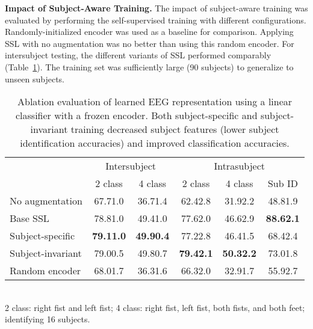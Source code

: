 \documentclass{article}
\newcommand{\std}[1]{{\scriptsize{#1}}}
\renewcommand{\paragraph}[1]{\textbf{#1}\hspace{1em}}
\begin{document}
\paragraph{Impact of Subject-Aware Training.}
The impact of subject-aware training was evaluated by performing the
self-supervised training with different configurations. Randomly-initialized
encoder was used as a baseline for comparison. Applying SSL with no augmentation
was no better than using this random encoder. For intersubject testing, the
different variants of SSL performed comparably (Table~\ref{table:eeg:losses}).
The training set was sufficiently large (90 subjects) to generalize to unseen
subjects.



\begin{table}
  \caption{Ablation evaluation of learned EEG representation using a linear
  classifier with a frozen encoder. Both subject-specific and subject-invariant
  training decreased subject features (lower subject identification accuracies)
  and improved classification accuracies.}
  \label{table:eeg:losses}
  \centering
  \small
  \begin{tabular}{lccccc}
    \toprule
    & \multicolumn{2}{c}{Intersubject} & \multicolumn{3}{c}{Intrasubject} \\
    \cmidrule(lr){2-3}\cmidrule(lr){4-6}
    & 2 class & 4 class & 2 class & 4 class & Sub ID\\
    \hline
No augmentation
& 67.7\std{1.0} & 36.7\std{1.4}
& 62.4\std{2.8} & 31.9\std{2.2}
& 48.8\std{1.9} \\

Base SSL
& 78.8\std{1.0} & 49.4\std{1.0}
& 77.6\std{2.0} & 46.6\std{2.9}
& \textbf{88.6\std{2.1}} \\



Subject-specific
& \textbf{79.1\std{1.0}} & \textbf{49.9\std{0.4}}
& 77.2\std{2.8} & 46.4\std{1.5}
& 68.4\std{2.4} \\

Subject-invariant
& 79.0\std{0.5} & 49.8\std{0.7}
& \textbf{79.4\std{2.1}} & \textbf{50.3\std{2.2}}
& 73.0\std{1.8} \\



    \hline
    Random encoder
& 68.0\std{1.7} & 36.3\std{1.6}
& 66.3\std{2.0} & 32.9\std{1.7}
& 55.9\std{2.7} \\
    \bottomrule
  \end{tabular}\\
  \footnotesize{2 class: right fist and left fist; 4 class: right
  fist, left fist, both fists, and both feet; identifying 16 subjects.}
\end{table} 
\end{document}
